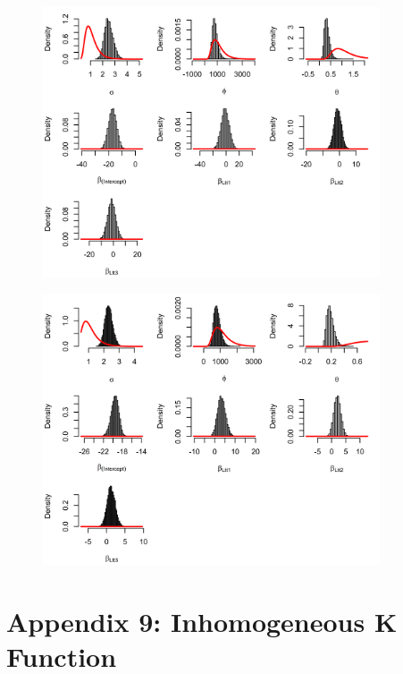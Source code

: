 \documentclass[12pt,a4paper]{report}
\begin{document}
\begin{figure}[H]
\begin{center}
\includegraphics[width = \linewidth, height = 80mm]{Prior and posterior density plots - Major 2.png}
\end{center}
\end{figure}

\begin{figure}[H]
\begin{center}
\includegraphics[width = \linewidth, height = 80mm]{Prior and posterior density plots - Major 13456.png}
\end{center}
\end{figure}

\newpage
\section*{Appendix 9: Inhomogeneous K Function}
\end{document}
